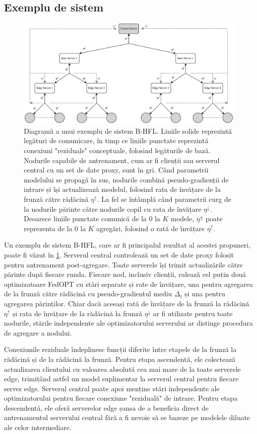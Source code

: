 \subsection{Exemplu de sistem}\label{sec:example_system}
\begin{figure}[h]
    \centering
    \includegraphics[clip,width=.8\columnwidth]{plots/Tree_Structure.drawio.pdf}
    \caption[System Diagram]{Diagramă a unui exemplu de sistem B-HFL. Liniile solide reprezintă legături de comunicare, în timp ce liniile punctate reprezintă conexiuni "reziduale" conceptuale, folosind legăturile de bază. Nodurile capabile de antrenament, cum ar fi clienții sau serverul central cu un set de date proxy, sunt în gri. Când parametrii modelului se propagă în sus, nodurile combină pseudo-gradienții de intrare și își actualizează modelul, folosind rata de învățare de la frunză către rădăcină $\eta^\uparrow$. La fel se întâmplă când parametrii curg de la nodurile părinte către nodurile copil cu rata de învățare $\eta^\downarrow$. Deoarece liniile punctate comunică de la $0$ la $K$ modele, $\eta^\Uparrow$ poate reprezenta de la $0$ la $K$ agregări, folosind o rată de învățare $\eta^\uparrow$.
    }\label{fig:TreeStructure}
\end{figure}

Un exemplu de sistem B-HFL, care ar fi principalul rezultat al acestei propuneri, poate fi văzut în \cref{fig:TreeStructure}. Serverul central controlează un set de date proxy folosit pentru antrenament post-agregare. Toate serverele își trimit actualizările către părinte după fiecare runda. Fiecare nod, inclusiv clienții, rulează cel puțin două optimizatoare FedOPT cu stări separate și rate de învățare, una pentru agregarea de la frunză către rădăcină cu pseudo-gradientul mediu $\Delta_t$ și una pentru agregarea părinților. Chiar dacă aceeași rată de învățare de la frunză la rădăcină $\eta^\uparrow$ și rata de învățare de la rădăcină la frunză $\eta^\downarrow$ ar fi utilizate pentru toate nodurile, stările independente ale optimizatorului serverului ar distinge procedura de agregare a nodului.

Conexiunile reziduale îndeplinesc funcții diferite între etapele de la frunză la rădăcină și de la rădăcină la frunză. Pentru etapa ascendentă, ele colectează actualizarea clientului cu valoarea absolută cea mai mare de la toate serverele edge, trimițând astfel un model suplimentar la serverul central pentru fiecare server edge. Serverul central poate apoi menține stări independente ale optimizatorului pentru fiecare conexiune "reziduală" de intrare. Pentru etapa descendentă, ele oferă serverelor edge șansa de a beneficia direct de antrenamentul serverului central fără a fi nevoie să se bazeze pe modelele diluate ale celor intermediare.

